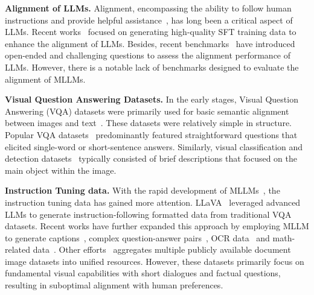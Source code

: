 \textbf{Alignment of LLMs.} Alignment, encompassing the ability to follow human instructions and provide helpful assistance~\cite{liu2024trustworthyllmssurveyguideline}, has long been a critical aspect of LLMs. 
Recent works~\cite{wang2023openchat,xu2024magpie,cao2025condor} focused on generating high-quality SFT training data to enhance the alignment of LLMs. 
Besides, recent benchmarks~\cite{liu2023alignbench,alpaca_eval,li2024crowdsourced} have introduced open-ended and challenging questions to assess the alignment performance of LLMs. 
However, there is a notable lack of benchmarks designed to evaluate the alignment of MLLMs.

\noindent\textbf{Visual Question Answering Datasets.} In the early stages, Visual Question Answering (VQA) datasets were primarily used for basic semantic alignment between images and text~\cite{radford2021learning,li2022blip, zhao2024open}. These datasets were relatively simple in structure. Popular VQA datasets~\cite{hudson2019gqa, antol2015vqa} predominantly featured straightforward questions that elicited single-word or short-sentence answers. Similarly, visual classification and detection datasets~\cite{lin2014microsoft, schuhmann2021laion, sharma2018conceptual} typically consisted of brief descriptions that focused on the main object within the image.

\noindent\textbf{Instruction Tuning data.} With the rapid development of MLLMs~\cite{chen2024far, bai2023qwen}, the instruction tuning data has gained more attention. LLaVA~\cite{liu2023visual} leveraged advanced LLMs to generate instruction-following formatted data from traditional VQA datasets. Recent works have further expanded this approach by employing MLLM to generate captions~\cite{chen2023sharegpt4v}, complex question-answer pairs~\cite{ chen2024allava, gu2024infinity}, OCR data~\cite{textocr-gpt4v} and math-related data~\cite{shi2024math}. Other efforts~\cite{tong2024cambrian, li2024llava} aggregates multiple publicly available document image datasets into unified resources. However, these datasets primarily focus on fundamental visual capabilities with short dialogues and factual questions, resulting in suboptimal alignment with human preferences.

